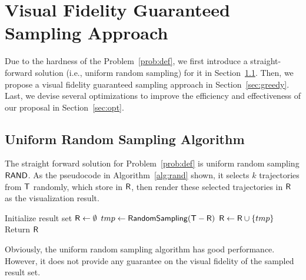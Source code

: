 \section{Visual Fidelity Guaranteed Sampling Approach}\label{sec:sol}
Due to the hardness of the Problem~\ref{prob:def}, we first introduce a straight-forward solution (i.e., uniform random sampling) for it in Section~\ref{sec:random}.
Then, we propose a visual fidelity guaranteed sampling approach in Section~\ref{sec:greedy}.
Last, we devise several optimizations to improve the efficiency and effectiveness of our proposal in Section~\ref{sec:opt}.


\subsection{Uniform Random Sampling Algorithm}\label{sec:random}
The straight forward solution for Problem~\ref{prob:def} is uniform random sampling $\mathsf{RAND}$.
As the pseudocode in Algorithm~\ref{alg:rand} shown, it selects $k$ trajectories from $\mathsf{T}$ randomly, which store in $\mathsf{R}$,
then render these selected trajectories in $\mathsf{R}$ as the visualization result.

\begin{algorithm}
    \caption{$\rand(\D,k=\alpha |\D|)$} \label{alg:rand}
    \begin{algorithmic}[1]
    \State Initialize result set $\mathsf{R} \leftarrow \emptyset$
        \State $tmp \leftarrow \mathsf{RandomSampling(\mathsf{T}-\mathsf{R})}$
        \State $\mathsf{R} \leftarrow \mathsf{R} \cup \{ tmp \}$
    \EndWhile
    \State Return $\mathsf{R}$
    \end{algorithmic}

\end{algorithm}



Obviously, the uniform random sampling algorithm has good performance.
However, it does not provide any guarantee on the visual fidelity of the sampled result set.





